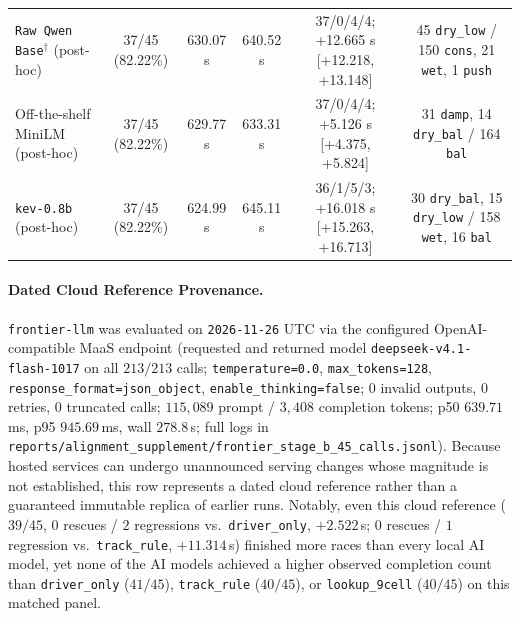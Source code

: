 \documentclass[11pt,a4paper]{article}
\begin{document}
\begin{table}[t]
{\begin{tabular}{lccccc}
\texttt{Raw Qwen Base}$^{\dagger}$ (post-hoc) & 37/45 (82.22\%) & 630.07 s & 640.52 s & 37/0/4/4; +12.665 s [+12.218, +13.148] & 45 \texttt{dry\_low} / 150 \texttt{cons}, 21 \texttt{wet}, 1 \texttt{push} \\
Off-the-shelf MiniLM (post-hoc) & 37/45 (82.22\%) & 629.77 s & 633.31 s & 37/0/4/4; +5.126 s [+4.375, +5.824] & 31 \texttt{damp}, 14 \texttt{dry\_bal} / 164 \texttt{bal} \\
\texttt{kev-0.8b} (post-hoc) & 37/45 (82.22\%) & 624.99 s & 645.11 s & 36/1/5/3; +16.018 s [+15.263, +16.713] & 30 \texttt{dry\_bal}, 15 \texttt{dry\_low} / 158 \texttt{wet}, 16 \texttt{bal} \\
\bottomrule
\end{tabular}}
\end{table}

\paragraph{Dated Cloud Reference Provenance.}
\texttt{frontier-llm} was evaluated on \texttt{2026-11-26} UTC via the configured OpenAI-compatible MaaS endpoint (requested and returned model \texttt{deepseek-v4.1-flash-1017} on all $213/213$ calls; \texttt{temperature=0.0}, \texttt{max\_tokens=128}, \nolinkurl{response_format=json_object}, \nolinkurl{enable_thinking=false}; $0$ invalid outputs, $0$ retries, $0$ truncated calls; $115{,}089$ prompt / $3{,}408$ completion tokens; p50 $639.71$\,ms, p95 $945.69$\,ms, wall $278.8$\,s; full logs in \nolinkurl{reports/alignment_supplement/frontier_stage_b_45_calls.jsonl}). Because hosted services can undergo unannounced serving changes whose magnitude is not established, this row represents a dated cloud reference rather than a guaranteed immutable replica of earlier runs. Notably, even this cloud reference ($39/45$, $0$ rescues / $2$ regressions vs.\ \texttt{driver\_only}, $+2.522$\,s; $0$ rescues / $1$ regression vs.\ \texttt{track\_rule}, $+11.314$\,s) finished more races than every local AI model, yet none of the AI models achieved a higher observed completion count than \texttt{driver\_only} ($41/45$), \texttt{track\_rule} ($40/45$), or \texttt{lookup\_9cell} ($40/45$) on this matched panel.
\end{document}
